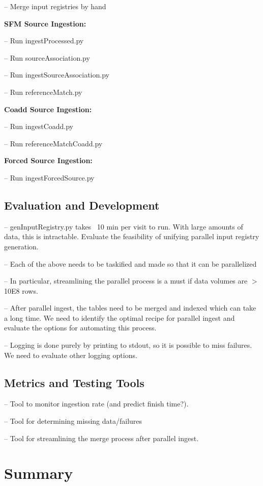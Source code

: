 \documentclass[prd, nofootinbib, floatfix, 11pt,tightenlines,times]{article}
\begin{document}
-- Merge input registries by hand

{\bf SFM Source Ingestion:}

-- Run ingestProcessed.py

-- Run sourceAssociation.py

-- Run ingestSourceAssociation.py

-- Run referenceMatch.py

{\bf Coadd Source Ingestion:}

-- Run ingestCoadd.py

-- Run referenceMatchCoadd.py

{\bf Forced Source Ingestion:}

-- Run ingestForcedSource.py

\subsection{Evaluation and Development}
-- genInputRegistry.py takes ~10 min per visit to run.  With large amounts of data, this is intractable.  Evaluate the feasibility of unifying parallel input registry generation.

-- Each of the above needs to be taskified and made so that it can be parallelized

-- In particular, streamlining the parallel process is a must if data volumes are $>$ 10E8 rows.

-- After parallel ingest, the tables need to be merged and indexed which can take a long time.  We need to identify the optimal recipe for parallel ingest and evaluate the options for automating this process.

-- Logging is done purely by printing to stdout, so it is possible to miss failures.  We need to evaluate other logging options.

\subsection{Metrics and Testing Tools}

-- Tool to monitor ingestion rate (and predict finish time?).

-- Tool for determining missing data/failures

-- Tool for streamlining the merge process after parallel ingest.


\section{Summary} 
\end{document}

